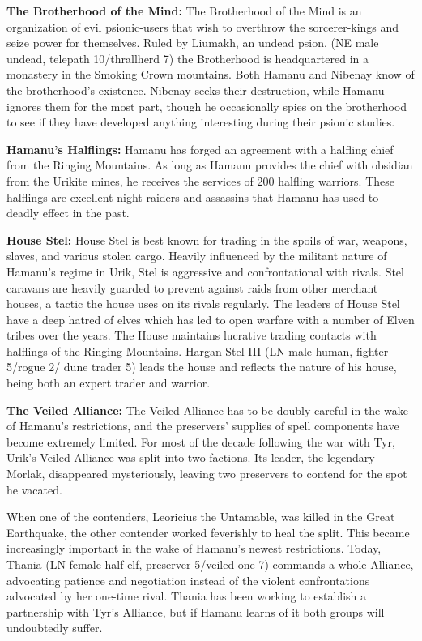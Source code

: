 {
	\textbf{The Brotherhood of the Mind:} The Brotherhood of the Mind is an organization of evil psionic-users that wish to overthrow the sorcerer-kings and seize power for themselves. Ruled by Liumakh, an undead psion, (NE male undead, telepath 10/thrallherd 7) the Brotherhood is headquartered in a monastery in the Smoking Crown mountains. Both Hamanu and Nibenay know of the brotherhood's existence. Nibenay seeks their destruction, while Hamanu ignores them for the most part, though he occasionally spies on the brotherhood to see if they have developed anything interesting during their psionic studies.

	\textbf{Hamanu's Halflings:} Hamanu has forged an agreement with a halfling chief from the Ringing Mountains. As long as Hamanu provides the chief with obsidian from the Urikite mines, he receives the services of 200 halfling warriors. These halflings are excellent night raiders and assassins that Hamanu has used to deadly effect in the past.

	\textbf{House Stel:} House Stel is best known for trading in the spoils of war, weapons, slaves, and various stolen cargo. Heavily influenced by the militant nature of Hamanu's regime in Urik, Stel is aggressive and confrontational with rivals. Stel caravans are heavily guarded to prevent against raids from other merchant houses, a tactic the house uses on its rivals regularly. The leaders of House Stel have a deep hatred of elves which has led to open warfare with a number of Elven tribes over the years. The House maintains lucrative trading contacts with halflings of the Ringing Mountains. Hargan Stel III (LN male human, fighter 5/rogue 2/ dune trader 5) leads the house and reflects the nature of his house, being both an expert trader and warrior.

	\textbf{The Veiled Alliance:} The Veiled Alliance has to be doubly careful in the wake of Hamanu's restrictions, and the preservers' supplies of spell components have become extremely limited. For most of the decade following the war with Tyr, Urik's Veiled Alliance was split into two factions. Its leader, the legendary Morlak, disappeared mysteriously, leaving two preservers to contend for the spot he vacated.

	When one of the contenders, Leoricius the Untamable, was killed in the Great Earthquake, the other contender worked feverishly to heal the split. This became increasingly important in the wake of Hamanu's newest restrictions. Today, Thania (LN female half-elf, preserver 5/veiled one 7) commands a whole Alliance, advocating patience and negotiation instead of the violent confrontations advocated by her one-time rival. Thania has been working to establish a partnership with Tyr's Alliance, but if Hamanu learns of it both groups will undoubtedly suffer.
}
